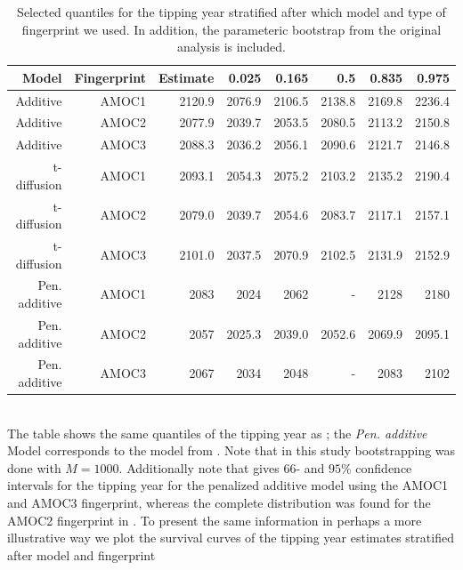\begin{table}[ht]
    \centering
    \begin{tabular}{rrrrrrrr}
    Model & Fingerprint & Estimate    & 0.025  & 0.165  & 0.5    & 0.835  & 0.975 \\ 
      \hline
    Additive & AMOC1 & 2120.9         & 2076.9 & 2106.5 & 2138.8 & 2169.8 & 2236.4 \\
    Additive & AMOC2 & 2077.9         & 2039.7 & 2053.5 & 2080.5 & 2113.2 & 2150.8 \\ 
    Additive & AMOC3 & 2088.3         & 2036.2 & 2056.1 & 2090.6 & 2121.7 & 2146.8 \\ \hline 
    t-diffusion & AMOC1 & 2093.1      & 2054.3 & 2075.2 & 2103.2 & 2135.2 & 2190.4 \\ 
    t-diffusion & AMOC2 & 2079.0      & 2039.7 & 2054.6 & 2083.7 & 2117.1 & 2157.1 \\ 
    t-diffusion & AMOC3 & 2101.0      & 2037.5 & 2070.9 & 2102.5 & 2131.9 & 2152.9 \\ 
    \hline 
    Pen. additive& AMOC1 & 2083       & 2024 & 2062 & - & 2128 & 2180 \\
    Pen. additive& AMOC2 & 2057       & 2025.3 & 2039.0 & 2052.6 & 2069.9 & 2095.1 \\ 
    Pen. additive& AMOC3 & 2067       & 2034 & 2048 & - & 2083 & 2102 \\
       \hline
    \end{tabular}
    \caption{Selected quantiles for the tipping year stratified after which model and type of fingerprint we used. In addition, the parameteric bootstrap from the original analysis \cite{Ditlevsen2023} is included.}
    \label{table:tipping_quantiles}
\end{table}\\
The table shows the same quantiles of the tipping year as \cite{DitlevsenSupplementary}; the \textit{Pen. additive} Model corresponds to the model from \cite{Ditlevsen2023}. Note that in this study bootstrapping was done with $M = 1000$. Additionally note that \cite[table 1]{Ditlevsen2023} gives $66$- and $95\%$ confidence intervals for the tipping year for the penalized additive model using the AMOC1 and AMOC3 fingerprint, whereas the complete distribution was found for the AMOC2 fingerprint in \cite{DitlevsenSupplementary}.\newpage 
\noindent To present the same information in perhaps a more illustrative way we plot the survival curves of the tipping year estimates stratified after model and fingerprint
